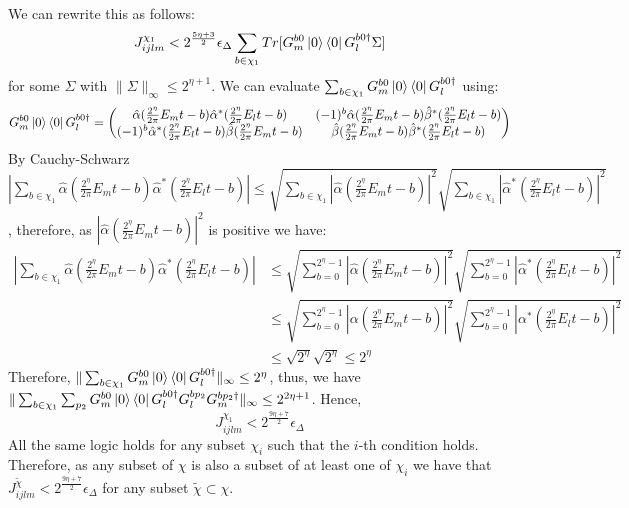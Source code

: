 \documentclass[aps,floatfix,10pt,amssymb,amsfont,amsmath,superscriptaddress,float,nofootinbib,longbibliography,nobalancelastpage,twocolumn]{revtex4-2}
\begin{document}
We can rewrite this as follows:
\begin{equation}
        J_{ijlm}^{\chi_1} < 2^{\frac{5 \eta + 3}{2}}\epsilon_{\Delta} \sum_{b \in \chi_1} Tr[G^{b0}_m\ket{0}\bra{0} G^{b0\dagger}_l \Sigma]
\end{equation}
for some $\Sigma$ with $\|\Sigma\|_{\infty} \leq 2^{\eta+1}$. We can evaluate $\sum_{b\in \chi_1} G^{b0}_m\ket{0}\bra{0} G^{b0\dagger}_l$ using:
\begin{equation}
    G^{b0}_m\ket{0}\bra{0} G^{b0\dagger}_l = \begin{pmatrix}
        \hat \alpha (\frac{2^{\eta}}{2\pi}E_mt-b)\hat \alpha^* (\frac{2^{\eta}}{2\pi}E_lt-b) & (-1)^b \hat \alpha (\frac{2^{\eta}}{2\pi}E_mt-b) \hat \beta^* (\frac{2^{\eta}}{2\pi}E_lt-b) \\
        (-1)^b \hat \alpha^* (\frac{2^{\eta}}{2\pi}E_lt-b) \hat \beta (\frac{2^{\eta}}{2\pi}E_mt-b) & \hat \beta (\frac{2^{\eta}}{2\pi}E_mt-b)\hat \beta^* (\frac{2^{\eta}}{2\pi}E_lt-b)
    \end{pmatrix}
\end{equation}
By Cauchy-Schwarz $|\sum_{b\in \chi_1}  \hat \alpha (\frac{2^{\eta}}{2\pi}E_mt-b)\hat \alpha^* (\frac{2^{\eta}}{2\pi}E_lt-b)| \leq \sqrt{\sum_{b \in \chi_1} |\hat \alpha (\frac{2^{\eta}}{2\pi}E_mt-b)|^2}\sqrt{\sum_{b \in \chi_1} |\hat \alpha^* (\frac{2^{\eta}}{2\pi}E_lt-b)|^2}$, therefore, as $|\hat \alpha (\frac{2^{\eta}}{2\pi}E_mt-b)|^2$ is positive we have:
\begin{align}
    \left|\sum_{b\in \chi_1}  \hat \alpha (\frac{2^{\eta}}{2\pi}E_mt-b)\hat \alpha^* (\frac{2^{\eta}}{2\pi}E_lt-b)\right| &\leq \sqrt{\sum_{b=0}^{2^{\eta}-1} |\hat \alpha (\frac{2^{\eta}}{2\pi}E_mt-b)|^2}\sqrt{\sum_{b=0}^{2^{\eta}-1} |\hat \alpha^* (\frac{2^{\eta}}{2\pi}E_lt-b)|^2}\\
    &\leq \sqrt{\sum_{b=0}^{2^{\eta}-1} | \alpha (\frac{2^{\eta}}{2\pi}E_mt-b)|^2}\sqrt{\sum_{b=0}^{2^{\eta}-1} |\alpha^* (\frac{2^{\eta}}{2\pi}E_lt-b)|^2}\\
    &\leq \sqrt{2^{\eta}}\sqrt{2^{\eta}} \leq 2^{\eta}
\end{align}
Therefore, $\|\sum_{b\in \chi_1} G^{b0}_m\ket{0}\bra{0} G^{b0\dagger}_l\|_{\infty} \leq 2^{\eta}$, thus, we have $\|\sum_{b\in \chi_1}\sum_{p_2} G^{b0}_m\ket{0}\bra{0} G^{b0\dagger}_lG^{bp_2}_lG^{bp_2\dagger}_m\|_{\infty} \leq 2^{2\eta + 1}$. Hence,
\begin{equation}
    J_{ijlm}^{\chi_1} < 2^{\frac{9 \eta + 7}{2}}\epsilon_{\Delta}
\end{equation}
All the same logic holds for any subset $\chi_i$ such that the $i$-th condition holds. Therefore, as any subset of $\chi$ is also a subset of at least one of $\chi_i$ we have that $J_{ijlm}^{\tilde \chi} < 2^{\frac{9 \eta + 7}{2}}\epsilon_{\Delta}$ for any subset $\tilde \chi \subset\chi$.
\end{document}
